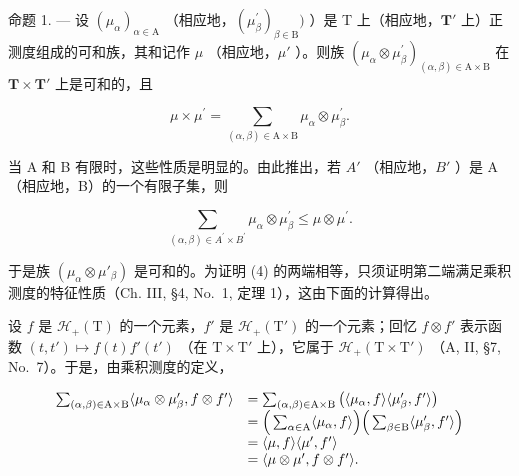 命题 1. --- 设 \((\mu_{\alpha})_{\alpha \in \mathrm{A}}\) （相应地，\((\mu_{\beta}^{\prime})_{\beta \in \mathrm{B}})\) ）是 T 上（相应地，\(\mathbf{T}'\) 上）正测度组成的可和族，其和记作 \(\mu\) （相应地，\(\mu'\) ）。则族 \((\mu_{\alpha} \otimes \mu_{\beta}^{\prime})_{(\alpha, \beta) \in \mathrm{A} \times \mathrm{B}}\) 在 \(\mathbf{T} \times \mathbf{T}'\) 上是可和的，且

\[
\mu \times \mu^ {\prime} = \sum_ {(\alpha , \beta) \in \mathrm{A} \times \mathrm{B}} \mu_ {\alpha} \otimes \mu_ {\beta} ^ {\prime}.\tag{4}
\]

当 A 和 B 有限时，这些性质是明显的。由此推出，若 \(A'\) （相应地，\(B'\) ）是 A（相应地，B）的一个有限子集，则

\[
\sum_ {(\alpha , \beta) \in A ^ {\prime} \times B ^ {\prime}} \mu_ {\alpha} \otimes \mu_ {\beta} ^ {\prime} \leqslant \mu \otimes \mu^ {\prime}.
\]

于是族 \((\mu_{\alpha} \otimes \mu'_{\beta})\) 是可和的。为证明 (4) 的两端相等，只须证明第二端满足乘积测度的特征性质（Ch. III, §4, No.~1, 定理 1），这由下面的计算得出。

设 \(f\) 是 \(\mathcal{H}_{+}(\mathrm{T})\) 的一个元素，\(f'\) 是 \(\mathcal{H}_{+}(\mathrm{T}')\) 的一个元素；回忆 \(f \otimes f'\) 表示函数 \((t, t') \mapsto f(t)f'(t')\) （在 \(\mathrm{T} \times \mathrm{T}'\) 上），它属于 \(\mathcal{H}_{+}(\mathrm{T} \times \mathrm{T}')\) （A, II, §7, No.~7）。于是，由乘积测度的定义，

\[
\begin{array}{r l} \sum_ {(\alpha , \beta) \in \mathrm{A} \times \mathrm{B}} \langle \mu_ {\alpha} \otimes \mu_ {\beta} ^ {\prime}, f \otimes f ^ {\prime} \rangle & = \sum_ {(\alpha , \beta) \in \mathrm{A} \times \mathrm{B}} \big (\langle \mu_ {\alpha}, f \rangle \langle \mu_ {\beta} ^ {\prime}, f ^ {\prime} \rangle \big) \\ & = \Big (\sum_ {\alpha \in \mathrm{A}} \langle \mu_ {\alpha}, f \rangle \Big) \Big (\sum_ {\beta \in \mathrm{B}} \langle \mu_ {\beta} ^ {\prime}, f ^ {\prime} \rangle \Big) \\ & = \langle \mu , f \rangle \langle \mu^ {\prime}, f ^ {\prime} \rangle \\ & = \langle \mu \otimes \mu^ {\prime}, f \otimes f ^ {\prime} \rangle . \end{array}
\]

